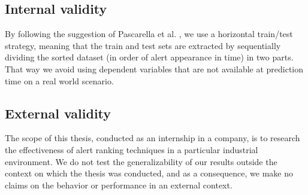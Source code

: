 \subsection{Internal validity}

By following the suggestion of Pascarella et al. \cite{performance_method_bug}, we use a horizontal train/test strategy, meaning that the train and test sets are extracted by sequentially dividing the sorted dataset (in order of alert appearance in time) in two parts. That way we avoid using dependent variables that are not available at prediction time on a real world scenario.


\subsection{External validity}
The scope of this thesis, conducted as an internship in a company, is to research the effectiveness of alert ranking techniques in a particular industrial environment. We do not test the generalizability of our results outside the context on which the thesis was conducted, and as a consequence, we make no claims on the behavior or performance in an external context.
